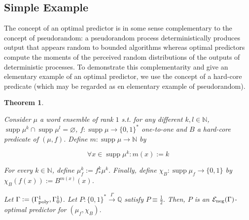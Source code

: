 \documentclass{article}
\numberwithin{equation}{section}
\theoremstyle{definition}
\theoremstyle{plain}
\newtheorem{theorem}{Theorem}[section]
\newcommand{\Bool}{\{0,1\}}
\newcommand{\Words}{{\Bool^*}}
\DeclareMathOperator{\Supp}{supp}
\newcommand{\Nats}{\mathbb{N}}
\newcommand{\Rats}{\mathbb{Q}}
\newcommand{\Fall}{\mathcal{E}}
\newcommand{\Scheme}{\xrightarrow{\Gamma}}
\begin{document}
\subsection{Simple Example}
\label{sec:fundamentals__one_way}

The concept of an optimal predictor is in some sense complementary to the concept of pseudorandom: a pseudorandom process deterministically produces output that appears random to bounded algorithms whereas optimal predictors compute the moments of the perceived random distributions of the outputs of deterministic processes. To demonstrate this complementarity and give an elementary example of an optimal predictor, we use the concept of a hard-core predicate (which may be regarded as en elementary example of pseudorandom).

\begin{theorem}
\label{thm:hard_core}

Consider $\mu$ a word ensemble of rank ${1}$ s.t. for any different $k,l \in \Nats$, ${\Supp \mu^k \cap \Supp \mu^l = \varnothing}$, ${f: \Supp \mu \rightarrow \Words}$ one-to-one and $B$ a hard-core predicate of $(\mu,f)$. Define ${m: \Supp \mu \rightarrow \Nats}$ by 

\[\forall x \in \Supp \mu^k: m(x):=k\]

For every $k \in \Nats$, define ${\mu_f^k:=f_*^k\mu^k}$.  Finally, define ${\chi_B: \Supp \mu_f \rightarrow \Bool}$ by ${\chi_B(f(x)):=B^{m(x)}(x)}$.

Let $\Gamma:=(\Gamma_{\textnormal{poly}}^1,\Gamma_0^1)$. Let $P: \Words \Scheme \Rats$ satisfy $P \equiv \frac{1}{2}$. Then, $P$ is an $\Fall_{\textnormal{neg}}(\Gamma)$-optimal predictor for $(\mu_f, \chi_B)$.

\end{theorem}
\end{document}
